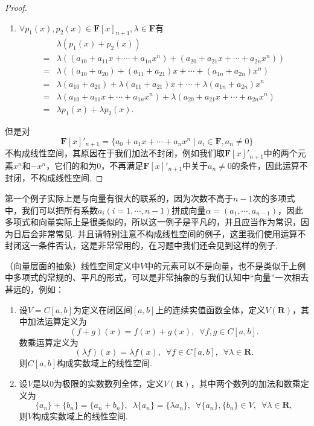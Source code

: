 \begin{proof}
\begin{enumerate}
        \item $\forall p_1(x), p_2(x) \in \mathbf{F}[x]_{n+1}, \lambda \in \mathbf{F}$有
            \begin{align*}
                    & \lambda(p_1(x) + p_2(x))                                                                        \\
                ={} & \lambda((a_{10} + a_{11}x + \cdots + a_{1n}x^n) + (a_{20} + a_{21}x + \cdots + a_{2n}x^n))      \\
                ={} & \lambda((a_{10} + a_{20}) + (a_{11} + a_{21})x + \cdots + (a_{1n} + a_{2n})x^n)                 \\
                ={} & \lambda(a_{10} + a_{20}) + \lambda(a_{11} + a_{21})x + \cdots + \lambda(a_{1n} + a_{2n})x^n     \\
                ={} & \lambda(a_{10} + a_{11}x + \cdots + a_{1n}x^n) + \lambda(a_{20} + a_{21}x + \cdots + a_{2n}x^n) \\
                ={} & \lambda p_1(x) + \lambda p_2(x).
            \end{align*}
    \end{enumerate}
    但是对\[\mathbf{F}[x]'_{n+1}=\{a_0+a_1x+\cdots+a_nx^n \mid a_i\in\mathbf{F}, a_n\neq 0\}\]不构成线性空间，其原因在于我们加法不封闭，例如我们取$\mathbf{F}[x]'_{n+1}$中的两个元素$x^n$和$-x^n$，它们的和为$0$，不再满足$\mathbf{F}[x]'_{n+1}$中关于$a_n\neq 0$的条件，因此运算不封闭，不构成线性空间.
\end{proof}

第一个例子实际上是与向量有很大的联系的，因为次数不高于$n-1$次的多项式中，我们可以把所有系数$a_i(i=1,\cdots,n-1)$拼成向量$\alpha=(a_1,\cdots,a_{n-1})$，因此多项式和向量实际上是很类似的，所以这一例子是平凡的，并且应当作为常识，因为日后会非常常见. 并且请特别注意不构成线性空间的例子，这里我们使用运算不封闭这一条件否认，这是非常常用的，在习题中我们还会见到这样的例子.

\begin{example} \label{ex:2:函数和数列线性空间}
    （向量层面的抽象）线性空间定义中$V$中的元素可以不是向量，也不是类似于上例中多项式的常规的、平凡的形式，可以是非常抽象的与我们认知中``向量''一次相去甚远的，例如：
    \begin{enumerate}
        \item 设$V=C[a,b]$为定义在闭区间$[a,b]$上的连续实值函数全体，定义$V(\mathbf{R})$，其中加法运算定义为
              \[(f+g)(x)=f(x)+g(x),\enspace\forall f,g\in C[a,b].\]
              数乘运算定义为
              \[(\lambda f)(x)=\lambda f(x),\enspace\forall f\in C[a,b],\enspace\forall \lambda\in\mathbf{R}.\]
              则$C[a,b]$构成实数域上的线性空间.

        \item 设$V$是以$0$为极限的实数数列全体，定义$V(\mathbf{R})$，其中两个数列的加法和数乘定义为
        \[\{a_n\}+\{b_n\}=\{a_n+b_n\},\enspace\lambda\{a_n\}=\{\lambda a_n\},\enspace\forall \{a_n\},\{b_n\}\in V,\enspace\forall \lambda\in\mathbf{R},\]
        则$V$构成实数域上的线性空间.
    \end{enumerate}
\end{example}

